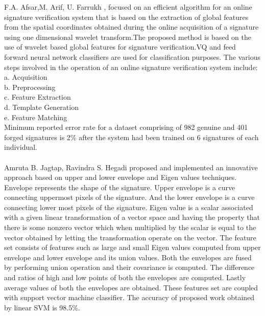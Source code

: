 \documentclass[]{article}
\begin{document}
	F.A. Afsar,M. Arif, U. Farrukh \cite{bib4}, focused on an efficient algorithm for an
	online signature verification system that is based on the extraction of global features from the spatial coordinates obtained during the online acquisition of a signature using one dimensional wavelet transform.The proposed method is based on the use of wavelet based global features for signature verification.VQ and feed
	forward neural network classifiers are used for	classification purposes.
	The various steps involved in the operation of an online signature verification system include:\\
	a. Acquisition\\
	b. Preprocessing\\
	c. Feature Extraction\\
	d. Template Generation\\
	e. Feature Matching\\
	Minimum reported error rate for a dataset comprising of 982 genuine and 401 forged
	signatures is 2\% after the system had been trained on 6 signatures of each individual.\\\\
	
	Amruta B. Jagtap, Ravindra S. Hegadi \cite{bib5} proposed and implemented an innovative approach based on upper and lower envelope and Eigen values techniques. 
	Envelope represents the shape of the signature. Upper envelope is a curve connecting 
	uppermost pixels of the signature. And the lower envelope is a curve connecting lower most pixels of the	signature. Eigen value is a scalar associated with a given linear transformation of a vector space and having 
	the property that there is some nonzero vector which when multiplied by the scalar is equal to the vector 
	obtained by letting the transformation operate on the vector.
	The feature set consists of features such as large and small Eigen values computed from upper 
	envelope and lower envelope and its union values. Both the envelopes are fused by performing union operation
	and their covariance is computed. The difference and ratios of high and low points of both the envelopes are 
	computed. Lastly average values of both the envelopes are obtained.
	These features set are coupled with support vector machine classifier. The accuracy of proposed work obtained
	by linear SVM is 98.5\%.\\\\
	
\end{document}
